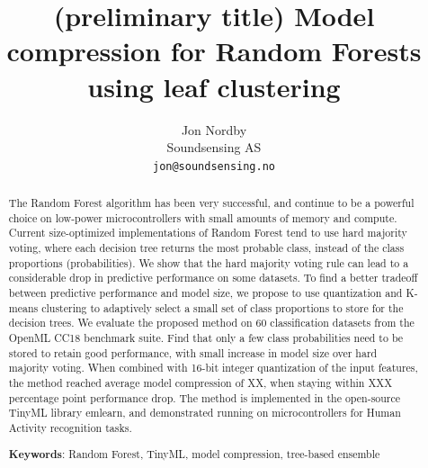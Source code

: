 \documentclass{article}
\begin{document}
\newcommand{\hyperparam}[1]{\texttt{\detokenize{#1}}}

\title{(preliminary title) Model compression for Random Forests using leaf clustering}

\author{
    Jon Nordby \\
	Soundsensing AS \\
	\texttt{jon@soundsensing.no} \\	
}

\date{}

\maketitle
\renewcommand{\abstractname}{\vspace{-\baselineskip}} %

\begin{abstract}	\noindent
The Random Forest algorithm has been very successful, and continue to be a powerful choice on low-power microcontrollers with small amounts of memory and compute.
Current size-optimized implementations of Random Forest tend to use hard majority voting, where each decision tree returns the most probable class, instead of the class proportions (probabilities).
We show that the hard majority voting rule can lead to a considerable drop in predictive performance on some datasets.
To find a better tradeoff between predictive performance and model size, we propose to use quantization and K-means clustering to adaptively select a small set of class proportions to store for the decision trees.
We evaluate the proposed method on 60 classification datasets from the OpenML CC18 benchmark suite.
Find that only a few class probabilities need to be stored to retain good performance,
with small increase in model size over hard majority voting.
When combined with 16-bit integer quantization of the input features, the method reached average model compression of XX, when staying within XXX percentage point performance drop.
The method is implemented in the open-source TinyML library emlearn, and demonstrated running on microcontrollers for Human Activity recognition tasks.

\noindent \textbf{Keywords}: Random Forest, TinyML, model compression, tree-based ensemble

\end{abstract}
\end{document}
